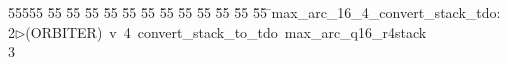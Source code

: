 %
%
\begin{tabbing}
55555 \= 55 \= 55 \= 55 \= 55 \= 55 \= 55 \= 55 \= 55 \= 55 \= 55 \= 55 \= 55 \= \>max\_arc\_16\_4\_convert\_stack\_tdo:\\[0pt]
2\>$\triangleright$\>(ORBITER)\ v\ 4\ convert\_stack\_to\_tdo\ max\_arc\_q16\_r4stack\\[0pt]
3\>\end{tabbing}
